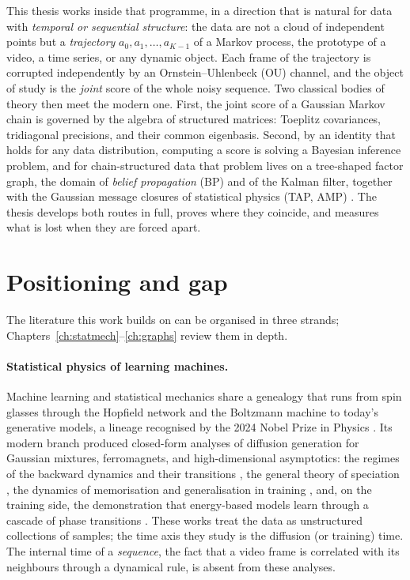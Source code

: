 This thesis works inside that programme, in a direction that is natural
for data with \emph{temporal or sequential structure}: the data are not
a cloud of independent points but a \emph{trajectory}
$a_0, a_1, \dots, a_{K-1}$ of a Markov process, the prototype of a
video, a time series, or any dynamic object. Each frame of the
trajectory is corrupted independently by an Ornstein--Uhlenbeck (OU)
channel, and the object of study is the \emph{joint} score of the whole
noisy sequence. Two classical bodies of theory then meet the modern one.
First, the joint score of a Gaussian Markov chain is governed by the
algebra of structured matrices: Toeplitz covariances, tridiagonal
precisions, and their common eigenbasis. Second, by an identity that
holds for any data distribution, computing a score is solving a Bayesian
inference problem, and for chain-structured data that problem lives on a
tree-shaped factor graph, the domain of \emph{belief propagation} (BP)
and of the Kalman filter, together with the Gaussian message closures
of statistical physics (TAP, AMP)
\citep{pearl1988probabilistic, mezard2009information, kalman1960new,
donoho2009message}. The thesis develops both routes in full, proves
where they coincide, and measures what is lost when they are forced
apart.

\section{Positioning and gap}

The literature this work builds on can be organised in three strands;
Chapters~\ref{ch:statmech}--\ref{ch:graphs} review them in depth.

\paragraph{Statistical physics of learning machines.} Machine learning
and statistical mechanics share a genealogy that runs from spin glasses
through the Hopfield network and the Boltzmann machine to today's
generative models, a lineage recognised by the 2024 Nobel Prize in
Physics \citep{hopfield1982neural, ackley1985learning, nobel2024physics}.
Its modern branch produced closed-form analyses of diffusion generation
for Gaussian mixtures, ferromagnets, and high-dimensional asymptotics:
the regimes of the backward dynamics and their transitions
\citep{biroli2023generative, biroli2024dynamical}, the general theory of
speciation \citep{achilli2026speciation, sclocchi2025phase}, the
dynamics of memorisation and generalisation in training
\citep{bonnaire2025memorize, garnierbrun2026biased}, and, on the
training side, the demonstration that energy-based models learn through
a cascade of phase transitions \citep{bachtis2024cascade}. These works
treat the data as unstructured collections of samples; the time axis
they study is the diffusion (or training) time. The internal time of a
\emph{sequence}, the fact that a video frame is correlated with its
neighbours through a dynamical rule, is absent from these analyses.

